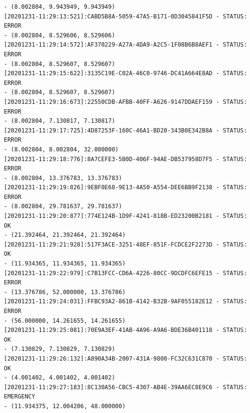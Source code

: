 \documentclass[11pt, oneside]{article}   	%
\begin{document}
\begin{Verbatim}[frame=topline,
			framesep=4mm,
			label=\fbox{\Large{STATUS\_20201231.log}}]
- (8.002804, 9.943949, 9.943949)
[20201231-11:29:13:521]:CABD5B8A-5059-47A5-B171-0D3045841F5D - STATUS: ERROR     
- (8.002804, 8.529606, 8.529606)
[20201231-11:29:14:572]:AF370229-A27A-4DA9-A2C5-1F08B6B8AEF1 - STATUS: ERROR     
- (8.002804, 8.529607, 8.529607)
[20201231-11:29:15:622]:3135C19E-C02A-46C0-9746-DC41A664E8AD - STATUS: ERROR     
- (8.002804, 8.529607, 8.529607)
[20201231-11:29:16:673]:22550CDB-AFBB-40FF-A626-9147DDAEF159 - STATUS: ERROR     
- (8.002804, 7.130817, 7.130817)
[20201231-11:29:17:725]:4D87253F-160C-46A1-BD20-343B0E342B8A - STATUS: ERROR     
- (8.002804, 8.002804, 32.000000)
[20201231-11:29:18:776]:8A7CEFE3-5B0D-406F-94AE-DB537958D7F5 - STATUS: ERROR     
- (8.002804, 13.376783, 13.376783)
[20201231-11:29:19:826]:9EBF0E68-9E13-4A50-A554-DEE6BB9F2138 - STATUS: ERROR     
- (8.002804, 29.781637, 29.781637)
[20201231-11:29:20:877]:774E124B-1D9F-4241-818B-ED23200B2181 - STATUS: OK        
- (21.392464, 21.392464, 21.392464)
[20201231-11:29:21:928]:517F3ACE-3251-48EF-851F-FCDCE2F2273D - STATUS: OK        
- (11.934365, 11.934365, 11.934365)
[20201231-11:29:22:979]:C7B13FCC-CD6A-4226-80CC-9DCDFC6EFE15 - STATUS: ERROR     
- (13.376786, 52.000000, 13.376786)
[20201231-11:29:24:031]:FFBC93A2-861B-4142-B32B-9AF055182E12 - STATUS: ERROR     
- (56.000000, 14.261655, 14.261655)
[20201231-11:29:25:081]:70E9A3EF-41AB-4A96-A9A6-BDE36B401118 - STATUS: OK        
- (7.130829, 7.130829, 7.130829)
[20201231-11:29:26:132]:A890A34B-2007-431A-9800-FC32C631C870 - STATUS: OK        
- (4.001402, 4.001402, 4.001402)
[20201231-11:29:27:183]:8C130A56-CBC5-4307-AB4E-39AA6EC8E9C6 - STATUS: EMERGENCY 
- (11.934375, 12.004206, 48.000000)
\end{Verbatim}
\end{document}
